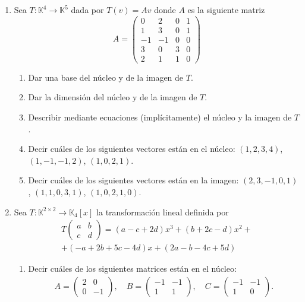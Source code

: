 \begin{enumerate}[topsep=6pt, itemsep=.4cm]
\item Sea $T: \mathbb{K}^4 \to \mathbb{K}^5$ dada por $T(v) = Av$ donde $A$ es la siguiente matriz
    $$
    A=\left(\begin{matrix}
    0& 2& 0&1\\   1& 3& 0&1\\  -1&-1&0&0\\3&0&3&0\\2&1&1&0 \end{matrix}
    \right)
    $$
    \begin{enumerate}[topsep=5pt,itemsep=5pt]
        \item Dar una base del núcleo y de la imagen de $T$. 
        \item Dar la dimensión del núcleo y de la imagen de $T$.
        \item Describir mediante ecuaciones (implícitamente) el núcleo y la imagen de $T$.
        \item Decir cuáles de los siguientes vectores están en el núcleo:
        $(1,2,3,4)$, $(1,-1,-1,2)$, $(1,0,2,1)$.
        \item Decir cuáles de los siguientes vectores están en la imagen:
        $(2,3,-1,0,1)$, $(1,1,0,3,1)$, $(1,0,2,1,0)$.
    \end{enumerate}
    

    \item Sea $T:\mathbb{K}^{2\times 2}\longrightarrow\mathbb{K}_{4}[x]$ la transformación lineal definida por
\begin{multline*}
T\left(\begin{array}{cc}
 a&b\\c&d
  \end{array}
\right)=
(a-c+2d)x^3+(b+2c-d)x^2+ \\
+(-a+2b+5c-4d)x+(2a-b-4c+5d)
\end{multline*}
\begin{enumerate}
 \item Decir cuáles de los siguientes matrices están en el núcleo:
 \begin{align*}
 A=\left(\begin{array}{rr}
    2&0\\0&-1
   \end{array}
   \right),
   \quad
   B=\left(\begin{array}{rr}
    -1&-1\\1&1
   \end{array}
   \right),
   \quad
   C=\left(\begin{array}{rr}
    -1&-1\\1&0
   \end{array}
   \right).
 \end{align*}


\end{enumerate}
\end{enumerate}
